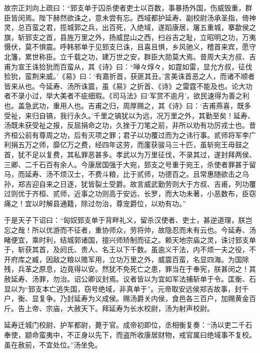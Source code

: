\documentclass[12pt,UTF8]{ctexbook}
\begin{document}
故宗正刘向上疏曰：“郅支单于囚杀使者吏士以百数，事暴扬外国，伤威毁重，群臣皆闵焉。陛下赫然欲诛之，意未尝有忘。西域都护延寿、副校尉汤承圣指，倚神灵，总百蛮之君，揽城郭之兵，出百死，入绝域，遂蹈康居，屠五重城，搴歙侯之旗，斩郅支之首，县旌万里之外，扬威昆山之西，扫谷吉之耻，立昭明之功，万夷慑伏，莫不惧震。呼韩邪单于见郅支已诛，且喜且惧，乡风驰义，稽首来宾，愿守北籓，累世称臣。立千载之功，建万世之安，群臣大勋莫大焉。昔周大夫方叔、吉甫为宣王诛猃狁而百蛮从，其《诗》曰：“啴々焞々，如霆如雷，显允方叔，征伐猃狁，蛮荆来威。’《易》曰：‘有嘉折首，获匪其丑。’言美诛首恶之人，而诸不顺者皆来从也。今延寿、汤所诛震，虽《易》之折首、《诗》之雷霆不能及也。论大功者不录小过，举大美者不疵细瑕。《司马法》曰‘军赏不逾月’，欲民速得为善之利也。盖急武功，重用人也。吉甫之归，周厚赐之，其《诗》曰：‘吉甫燕喜，既多受祉，来归自镐，我行永久。’千里之镐犹以为远，况万里之外，其勤至矣！延寿、汤既未获受祉之报，反屈捐命之功，久挫于刀笔之前，非所以劝有功厉戎士也。昔齐桓公前有尊周之功，后有灭项之罪；君子以功覆过而为之讳行事。贰师将军李广利捐五万之师，靡亿万之费，经四年这劳，而廑获骏马三十匹，虽斩宛王毋鼓之首，犹不足以复费，其私罪恶甚多。孝武以为万里征伐，不录其过，遂封拜两侯、三卿、二千石百有余人。今康居国强于大宛，郅支之号重于宛王，杀使者罪甚于留马，而延寿、汤不烦汉士，不费斗粮，比于贰师，功德百之。且常惠随欲击之乌孙，郑吉迎自来之日逐，犹皆裂土受爵。故言威武勤劳则大于方叔、吉甫，列功覆过则优于齐桓、贰师，近事之功则高于安远、长罗，而大功未著，小恶数布，臣窃痛之！宜以时解县通籍，除过勿治，尊宠爵位，以劝有功。”



于是天子下诏曰：“匈奴郅支单于背畔礼义，留杀汉使者、吏士，甚逆道理，朕岂忘之哉！所以优游而不征者，重协师众，劳将帅，故隐忍而未有云也。今延寿、汤睹便宜，乘时利，结城郭诸国，擅兴师矫制而征之。赖天地宗庙之灵，诛讨郅支单于，斩获其首，及阏氏、贵人、名王以下千数。虽逾义干法，内不烦一夫之役，不开府库之臧，因敌之粮以赡军用，立功万里之外，威震百蛮，名显四海。为国除残，兵革之原息，边竟得以安。然犹不免死亡之患，罪当在于奉宪，朕甚闵之！其赦延寿、汤罪，勿治。诏公卿议封焉。议者皆以为宜如军法捕斩单于令。匡衡、石显以为“郅支本亡逃失国，窃号绝域，非真单于”。元帝取安远侯郑吉故事，封千户，衡、显复争。乃封延寿为义成侯。赐汤爵关内侯，食邑各三百户，加赐黄金百斤。告上帝、宗庙，大赦天下。拜延寿为长水校尉，汤为射声校尉。



延寿迁城门校尉、护军都尉，薨于官。成帝初即位，丞相衡复奏：“汤以吏二千石奉使，颛命蛮夷中，不正身以先下，而盗所收康居财物，戒官属曰绝域事不复校。虽在赦前，不宜处位。”汤坐免。
\end{document}
